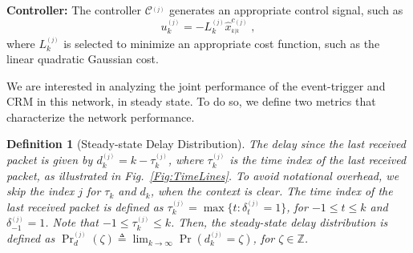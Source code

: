 \documentclass[journal]{IEEEtran}
\newtheorem{definition}{Definition}[section]
\begin{document}
\noindent \textbf{Controller:} The controller $\mathcal{C}^{_{(j)}}$ generates an appropriate control signal, such as
\begin{equation}
u^{_{(j)}}_k = -L^{_{(j)}}_k  \hat{x}^{c_{(j)}}_{^{k|k}} \;  , \label{Eq:Controller}
\end{equation}
where $L^{_{(j)}}_k$ is selected to minimize an appropriate cost function, such as the linear quadratic Gaussian cost.

We are interested in analyzing the joint performance of the event-trigger and CRM in this network, in steady state. To do so, we define two metrics that characterize the network performance.
\begin{definition}[Steady-state Delay Distribution]
The delay since the last received packet is given by $d^{_{(j)}}_k = k - \tau^{_{(j)}}_k$, where $\tau^{_{(j)}}_k$ is the time index of the last received packet, as illustrated in Fig.~\ref{Fig:TimeLines}. To avoid notational overhead, we skip the index $j$ for $\tau_k$ and $d_k$, when the context is clear. The time index of the last received packet is defined as $\tau^{_{(j)}}_k = \max\{t: \delta^{_{(j)}}_t=1\}$, for $-1 \le t \le k$ and $\delta^{_{(j)}}_{-1}=1$. Note that $-1 \le \tau^{_{(j)}}_k \le k$. Then, the steady-state delay distribution is defined as $\Pr^{_{(j)}}_{d}(\zeta) \triangleq \lim_{k \rightarrow \infty} \Pr(d^{_{(j)}}_k = \zeta)$, for $\zeta \in \mathbb{Z}$.
\end{definition}
\end{document}
